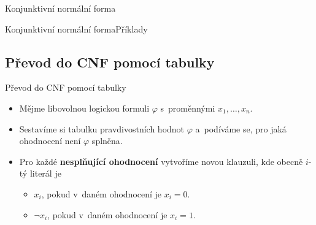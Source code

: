 \documentclass[11pt,professionalfont,aspectratio=43]{beamer}
\begin{document}
    \begin{frame}{Konjunktivní normální forma}
    \end{frame}

    \begin{frame}{Konjunktivní normální forma}{Příklady}
        \begin{itemize}
        \end{itemize}
    \end{frame}

    \subsection{Převod do CNF pomocí tabulky}

    \begin{frame}{Převod do CNF pomocí tabulky}
        \begin{itemize}
            \item Mějme libovolnou logickou formuli $\varphi$ s~proměnnými $x_1,\dots,x_n$.
            \item Sestavíme si tabulku pravdivostních hodnot $\varphi$ a~podíváme se, pro jaká ohodnocení není $\varphi$ splněna.
            \item Pro každé \textbf{nesplňující ohodnocení} vytvoříme novou klauzuli, kde obecně $i$-tý literál je
            \begin{itemize}
                \item $x_i$, pokud v~daném ohodnocení je $x_i=0$.
                \item $\neg x_i$, pokud v~daném ohodnocení je $x_i=1$.
            \end{itemize}
        \end{itemize}
    \end{frame}
\end{document}
